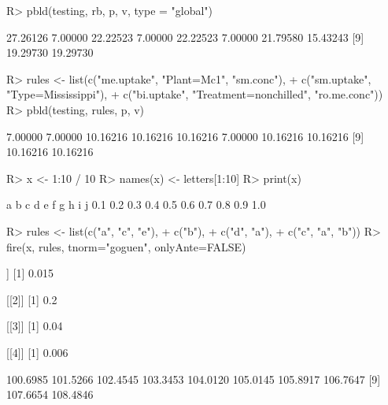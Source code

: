 \documentclass{article}\usepackage[]{graphicx}\usepackage[]{color}
\begin{document}
\begin{Schunk}
% --begin: "pbld6"
\begin{Sinput}
R> pbld(testing, rb, p, v, type = "global")
\end{Sinput}
\begin{Soutput}
 [1] 27.26126  7.00000 22.22523  7.00000 22.22523  7.00000 21.79580 15.43243
 [9] 19.29730 19.29730
\end{Soutput}
%
% --end: "pbld6"
\end{Schunk}

\begin{Schunk}
% --begin: "pbld_custom"
\begin{Sinput}
R> rules <- list(c("me.uptake", "Plant=Mc1", "sm.conc"),
+                c("sm.uptake", "Type=Mississippi"),
+                c("bi.uptake", "Treatment=nonchilled", "ro.me.conc"))
R> pbld(testing, rules, p, v)
\end{Sinput}
\begin{Soutput}
 [1]  7.00000  7.00000 10.16216 10.16216 10.16216  7.00000 10.16216 10.16216
 [9] 10.16216 10.16216
\end{Soutput}
%
% --end: "pbld_custom"
\end{Schunk}

\begin{Schunk}
% --begin: "fire"
\begin{Sinput}
R> x <- 1:10 / 10
R> names(x) <- letters[1:10]
R> print(x)
\end{Sinput}
\begin{Soutput}
  a   b   c   d   e   f   g   h   i   j 
0.1 0.2 0.3 0.4 0.5 0.6 0.7 0.8 0.9 1.0 
\end{Soutput}
\begin{Sinput}
R> rules <- list(c("a", "c", "e"),
+                c("b"),
+                c("d", "a"),
+                c("c", "a", "b"))
R> fire(x, rules, tnorm="goguen", onlyAnte=FALSE)
\end{Sinput}
\begin{Soutput}
[[1]]
[1] 0.015

[[2]]
[1] 0.2

[[3]]
[1] 0.04

[[4]]
[1] 0.006
\end{Soutput}
%
% --end: "fire"
\end{Schunk}

\begin{Schunk}
% --begin: "frbe"
\begin{Soutput}
 [1] 100.6985 101.5266 102.4545 103.3453 104.0120 105.0145 105.8917 106.7647
 [9] 107.6654 108.4846
\end{Soutput}
%
% --end: "frbe"
\end{Schunk}
\end{document}
